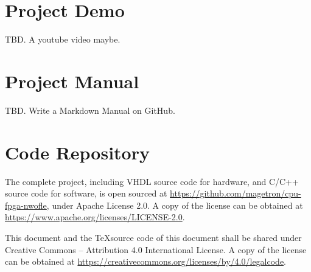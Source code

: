 \documentclass[a4paper]{report}
\newcommand{\proglang}{\textsf}
\begin{document}
\printbibliography[title=References]

\appendix

\chapter{Project Demo}

TBD. A youtube video maybe.

\chapter{Project Manual}

TBD. Write a Markdown Manual on GitHub.

\chapter{Code Repository}

The complete project, including \proglang{VHDL} source code for hardware, and \proglang{C/C++} source code for software, is open sourced at  \url{https://github.com/magetron/cpu-fpga-nwofle}, under Apache License 2.0. A copy of the license can be obtained at \url{https://www.apache.org/licenses/LICENSE-2.0}.

This document and the \TeX  source code of this document shall be shared under Creative Commons – Attribution 4.0 International License. A copy of the license can be obtained at \url{https://creativecommons.org/licenses/by/4.0/legalcode}.


\end{document}
